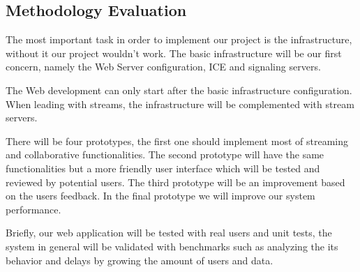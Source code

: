 
\subsection{Methodology Evaluation} %

The most important task in order to implement our project is the infrastructure, without it our project wouldn't work. The basic infrastructure will be our first concern, namely the Web Server configuration, ICE and signaling servers. 

The Web development can only start after the basic infrastructure configuration. When leading with streams, the infrastructure will be complemented with stream servers.

There will be four prototypes, the first one should implement most of streaming and collaborative functionalities. The second prototype will have the same functionalities but a more friendly user interface which will be tested and reviewed by potential users. The third prototype will be an improvement based on the users feedback. In the final prototype we will improve our system performance. 

Briefly, our web application will be tested with real users and unit tests, the system in general will be validated with benchmarks such as analyzing the its behavior and delays by growing the amount of users and data.